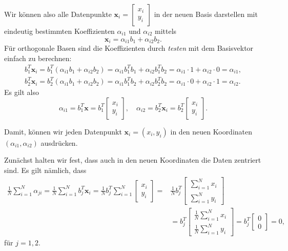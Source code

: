 \documentclass[
]{book}
\theoremstyle{definition}
\theoremstyle{definition}
\theoremstyle{definition}
\theoremstyle{definition}
\theoremstyle{remark}
\begin{document}
Wir können also alle Datenpunkte
\(\mathbf x_i = \begin{bmatrix} x_i \\ y_i \end{bmatrix}\)
in der neuen Basis darstellen mit eindeutig bestimmten Koeffizienten \(\alpha_{i1}\) und \(\alpha_{i2}\) mittels
\begin{equation*}
\mathbf x_i = \alpha_{i1}b_1 + \alpha_{i2}b_2.
\end{equation*}
Für orthogonale Basen sind die Koeffizienten durch \emph{testen} mit dem Basisvektor einfach zu berechnen:
\begin{align*}
b_1^T\mathbf x_i = b_1^T(\alpha_{i1}b_1 + \alpha_{i2}b_2) = \alpha_{i1}b_1^Tb_1 + \alpha_{i2}b_1^Tb_2 = \alpha_{i1}\cdot 1 + \alpha_{i2} \cdot 0 = \alpha_{i1},\\
b_2^T\mathbf x_i = b_2^T(\alpha_{i1}b_1 + \alpha_{i2}b_2) = \alpha_{i1}b_1^Tb_2 + \alpha_{i2}b_2^Tb_2 = \alpha_{i1}\cdot 0 + \alpha_{i2}\cdot 1 = \alpha_{i2}.
\end{align*}
Es gilt also
\begin{equation*}
\alpha_{i1} = b_1^T\mathbf x = b_1^T\begin{bmatrix}
x_i \\ y_i
\end{bmatrix}, \quad
\alpha_{i2} = b_2^T\mathbf x_i = b_2^T\begin{bmatrix}
x_i \\ y_i
\end{bmatrix}.
\end{equation*}

Damit, können wir jeden Datenpunkt \(\mathbf x_i=(x_i, y_i)\) in den neuen Koordinaten \((\alpha_{i1}, \alpha_{i2})\) ausdrücken.

Zunächst halten wir fest, dass auch in den neuen Koordinaten die Daten zentriert sind. Es gilt nämlich, dass
\begin{align*}
\frac 1N \sum_{i=1}^N \alpha_{ji}=\frac 1N \sum_{i=1}^N b_j^T\mathbf x_i 
=\frac 1N b_j^T \sum_{i=1}^N \begin{bmatrix} x_i \\ y_i \end{bmatrix}
=& \frac 1N b_j^T \begin{bmatrix} \sum_{i=1}^N x_i \\ \sum_{i=1}^N y_i \end{bmatrix}\\
&=b_j^T \begin{bmatrix} \frac 1N \sum_{i=1}^N x_i \\ \frac 1N \sum_{i=1}^N y_i \end{bmatrix}
=b_j^T \begin{bmatrix} 0 \\ 0 \end{bmatrix} = 0,
\end{align*}
für \(j=1,2\).
\end{document}
